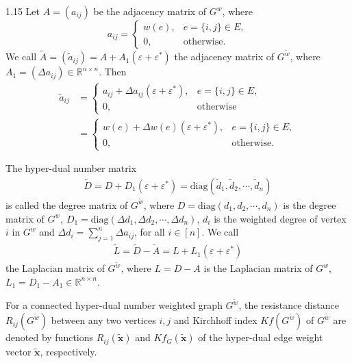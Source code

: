 \documentclass[preprint,12pt]{elsarticle1}
\numberwithin{equation}{section}
\begin{document}
\begin{spacing}{1.15}
Let  $A=(a_{ij})$ be  the adjacency matrix of  $G^{w}$, where $$a_{ij}
= \begin{cases}
w(e), & e=\{i,j\}\in E, \\
0, & \textrm{otherwise}.
\end{cases}$$
We call $\widetilde{A}=(\widetilde{a}_{ij})
=A+A_{1}(\varepsilon+\varepsilon^{*})$
 the adjacency matrix of $G^{\widetilde{w}}$, where $A_{1}=(\Delta a_{ij})\in \mathbb{R}^{n\times n}$. Then
\begin{equation}\label{chaoduiou}
    \begin{aligned}
\widetilde{a}_{ij}
&= \begin{cases}
a_{ij}+
\Delta a_{ij}(\varepsilon+\varepsilon^{*}), & e=\{i,j\}\in E, \\
0, & \textrm{otherwise}
\end{cases}
\\&= \begin{cases}
w(e)+
\Delta w(e)(\varepsilon+\varepsilon^{*}), & e=\{i,j\}\in E, \\
0, & \textrm{otherwise}.
\end{cases}
 \end{aligned}
\end{equation}

The hyper-dual number matrix \begin{align}\label{D1L} \widetilde{D}=D+D_{1}(\varepsilon+\varepsilon^{*})=\textrm{diag}(\widetilde{d}_{1},
\widetilde{d}_{2},\cdots,\widetilde{d}_{n})\end{align} is called  the degree matrix of $G^{\widetilde{w}}$, where $D=\textrm{diag}(d_{1},d_{2},\cdots,d_{n})$ is the degree matrix of  $G^{w}$, $D_{1}=\textrm{diag}(\Delta d_{1},\Delta d_{2}
 ,\cdots,\Delta d_{n})$, $d_{i}$ is the weighted degree of vertex  $i$ in $G^{w}$ and  $\Delta d_{i}=\sum\limits_{j=1}^{n}\Delta a_{ij}$, for all $i\in[n]$.
We call
\begin{equation}
    \begin{aligned}\label{lapu1}
\widetilde{L}=\widetilde{D}-\widetilde{A}
=L+L_{1}(\varepsilon+\varepsilon^{*})
 \end{aligned}
\end{equation}
 the Laplacian matrix of $G^{\widetilde{w}}$, where $L=D-A$  is the Laplacian matrix of  $G^{w}$, $L_{1}=D_{1}-A_{1}\in \mathbb{R}^{n\times n}$.

For a connected hyper-dual number weighted graph $G^{\widetilde{w}}$, the resistance distance $R_{ij}(G^{\widetilde{w}})$ between any two vertices $i,j$ and  Kirchhoff index $Kf(G^{\widetilde{w}})$ of  $G^{\widetilde{w}}$ are denoted by
 functions $R_{ij}(\widetilde{\textbf{x}})$ and
$Kf_{G}(\widetilde{\textbf{x}})$ of the hyper-dual edge weight vector $\widetilde{\textbf{x}}$, respectively.


\end{spacing}
\end{document}
